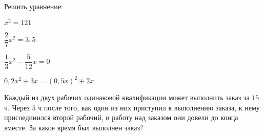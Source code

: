 \begin{class}[number=7]
\begin{listofex}
		\item {}
		\item Решить уравнение:
		\begin{enumcols}[itemcolumns=2]
			\item \( x^2=121 \)
			\item \( \dfrac{2}{7}x^2=3,5 \)
			\item \( \dfrac{1}{3}x^2-\dfrac{5}{12}x=0 \)
			\item \( 0,2x^2+3x=(0,5x)^2+2x \)
		\end{enumcols}
		\item Каждый из двух рабочих одинаковой квалификации может выполнить заказ за \( 15 \) ч. Через \( 5 \) ч после того, как один из них приступил к выполнению заказа, к нему присоединился второй рабочий, и работу над заказом они довели до конца вместе. За какое время был выполнен заказ?
	\end{listofex}
\end{class}
%
%
%	

